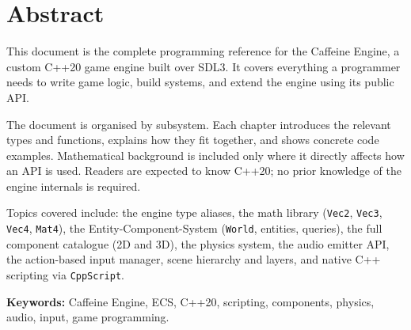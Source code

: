 \chapter*{Abstract}

This document is the complete programming reference for the Caffeine Engine,
a custom C++20 game engine built over SDL3. It covers everything a programmer
needs to write game logic, build systems, and extend the engine using its
public API.

The document is organised by subsystem. Each chapter introduces the relevant
types and functions, explains how they fit together, and shows concrete code
examples. Mathematical background is included only where it directly affects
how an API is used. Readers are expected to know C++20; no prior knowledge
of the engine internals is required.

Topics covered include: the engine type aliases, the math library
(\texttt{Vec2}, \texttt{Vec3}, \texttt{Vec4}, \texttt{Mat4}), the
Entity-Component-System (\texttt{World}, entities, queries), the full
component catalogue (2D and 3D), the physics system, the audio emitter API,
the action-based input manager, scene hierarchy and layers, and native C++
scripting via \texttt{CppScript}.

\bigskip
\textbf{Keywords:} Caffeine Engine, ECS, C++20, scripting, components,
physics, audio, input, game programming.

\pagestyle{plain}
\tableofcontents
